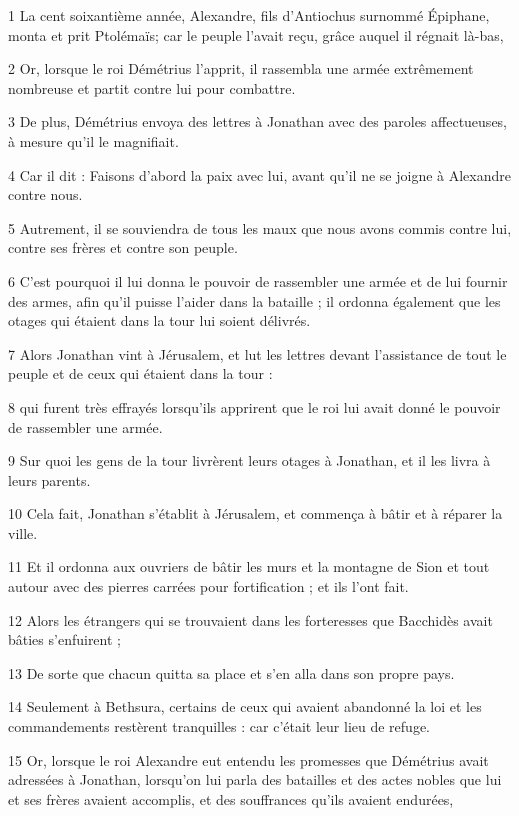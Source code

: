 
\par 1 La cent soixantième année, Alexandre, fils d'Antiochus surnommé Épiphane, monta et prit Ptolémaïs; car le peuple l'avait reçu, grâce auquel il régnait là-bas,
\par 2 Or, lorsque le roi Démétrius l'apprit, il rassembla une armée extrêmement nombreuse et partit contre lui pour combattre.
\par 3 De plus, Démétrius envoya des lettres à Jonathan avec des paroles affectueuses, à mesure qu'il le magnifiait.
\par 4 Car il dit : Faisons d'abord la paix avec lui, avant qu'il ne se joigne à Alexandre contre nous.
\par 5 Autrement, il se souviendra de tous les maux que nous avons commis contre lui, contre ses frères et contre son peuple.
\par 6 C'est pourquoi il lui donna le pouvoir de rassembler une armée et de lui fournir des armes, afin qu'il puisse l'aider dans la bataille ; il ordonna également que les otages qui étaient dans la tour lui soient délivrés.
\par 7 Alors Jonathan vint à Jérusalem, et lut les lettres devant l'assistance de tout le peuple et de ceux qui étaient dans la tour :
\par 8 qui furent très effrayés lorsqu'ils apprirent que le roi lui avait donné le pouvoir de rassembler une armée.
\par 9 Sur quoi les gens de la tour livrèrent leurs otages à Jonathan, et il les livra à leurs parents.
\par 10 Cela fait, Jonathan s'établit à Jérusalem, et commença à bâtir et à réparer la ville.
\par 11 Et il ordonna aux ouvriers de bâtir les murs et la montagne de Sion et tout autour avec des pierres carrées pour fortification ; et ils l'ont fait.
\par 12 Alors les étrangers qui se trouvaient dans les forteresses que Bacchidès avait bâties s'enfuirent ;
\par 13 De sorte que chacun quitta sa place et s'en alla dans son propre pays.
\par 14 Seulement à Bethsura, certains de ceux qui avaient abandonné la loi et les commandements restèrent tranquilles : car c'était leur lieu de refuge.
\par 15 Or, lorsque le roi Alexandre eut entendu les promesses que Démétrius avait adressées à Jonathan, lorsqu'on lui parla des batailles et des actes nobles que lui et ses frères avaient accomplis, et des souffrances qu'ils avaient endurées,

